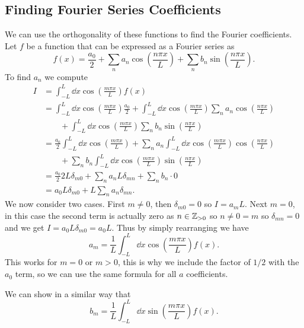\documentclass[a4paper]{article}
\begin{document}
    \subsection{Finding Fourier Series Coefficients}
    We can use the orthogonality of these functions to find the Fourier coefficients.
    Let \(f\) be a function that can be expressed as a Fourier series as
    \[f(x) = \frac{a_0}{2} + \sum_n a_n\cos\left(\frac{n\pi x}{L}\right) + \sum_n b_n\sin\left(\frac{n\pi x}{L}\right).\]
    To find \(a_n\) we compute
    \begin{align*}
        I &= \int_{-L}^{L} \dd{x} \cos\left(\frac{m\pi x}{L}\right)f(x)\\
        &= \int_{-L}^{L} \dd{x} \cos\left(\frac{m\pi x}{L}\right)\frac{a_0}{2} + \int_{-L}^{L} \dd{x} \cos\left(\frac{m\pi x}{L}\right)\sum_n a_n\cos\left
        (\frac{n\pi x}{L}\right)\\
        &\qquad + \int_{-L}^{L} \dd{x} \cos\left(\frac{m\pi x}{L}\right) \sum_n b_n\sin\left(\frac{n\pi x}{L}\right)\\
        &= \frac{a_0}{2}\int_{-L}^{L} \dd{x} \cos\left(\frac{m\pi x}{L}\right) + \sum_n a_n \int_{-L}^{L} \dd{x} \cos\left(\frac{m\pi x}{L}\right) \cos\left(\frac{n\pi x}{L}\right)\\
        &\qquad + \sum_n b_n \int_{-L}^{L} \dd{x} \cos\left(\frac{m\pi x}{L}\right) \sin\left(\frac{n\pi x}{L}\right)\\
        &= \frac{a_0}{2}2L\delta_{m0} + \sum_n a_n L\delta_{mn} + \sum_n b_n\cdot 0\\
        &= a_0L\delta_{m0} + L\sum_n a_n\delta_{mn}.
    \end{align*}
    We now consider two cases.
    First \(m \ne 0\), then \(\delta_{m0} = 0\) so \(I = a_mL\).
    Next \(m = 0\), in this case the second term is actually zero as \(n\in\mathbb{Z}_{>0}\) so \(n \ne 0 = m\) so \(\delta_{mn} = 0\) and we get \(I = a_0L\delta_{m0} = a_0L\).
    Thus by simply rearranging we have
    \[a_m = \frac{1}{L}\int_{-L}^{L} \dd{x}\cos\left(\frac{m\pi x}{L}\right)f(x).\]
    This works for \(m = 0\) or \(m > 0\), this is why we include the factor of \(1/2\) with the \(a_0\) term, so we can use the same formula for all \(a\) coefficients.
    
    We can show in a similar way that
    \[b_m = \frac{1}{L}\int_{-L}^{L} \dd{x} \sin\left(\frac{m\pi x}{L}\right)f(x).\]
    
\end{document}
